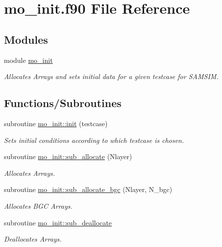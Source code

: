 \hypertarget{mo__init_8f90}{
\section{mo\_\-init.f90 File Reference}
\label{mo__init_8f90}
}
\subsection*{Modules}
\begin{DoxyCompactItemize}
\item 
module \hyperlink{namespacemo__init}{mo\_\-init}


\begin{DoxyCompactList}\small\item\em Allocates Arrays and sets initial data for a given testcase for SAMSIM. \item\end{DoxyCompactList}

\end{DoxyCompactItemize}
\subsection*{Functions/Subroutines}
\begin{DoxyCompactItemize}
\item 
subroutine \hyperlink{namespacemo__init_a32008745ff66791f91f74cd2f381f35f}{mo\_\-init::init} (testcase)
\begin{DoxyCompactList}\small\item\em Sets initial conditions according to which testcase is chosen. \item\end{DoxyCompactList}\item 
subroutine \hyperlink{namespacemo__init_a15907af975b8c0b390a260fba411f17d}{mo\_\-init::sub\_\-allocate} (Nlayer)
\begin{DoxyCompactList}\small\item\em Allocates Arrays. \item\end{DoxyCompactList}\item 
subroutine \hyperlink{namespacemo__init_a15996dd79eec9299b5aa0cb64a1e05ad}{mo\_\-init::sub\_\-allocate\_\-bgc} (Nlayer, N\_\-bgc)
\begin{DoxyCompactList}\small\item\em Allocates BGC Arrays. \item\end{DoxyCompactList}\item 
subroutine \hyperlink{namespacemo__init_acd486abfb3ef8b3a6a773d0c9c4b5698}{mo\_\-init::sub\_\-deallocate}
\begin{DoxyCompactList}\small\item\em Deallocates Arrays. \item\end{DoxyCompactList}\end{DoxyCompactItemize}
